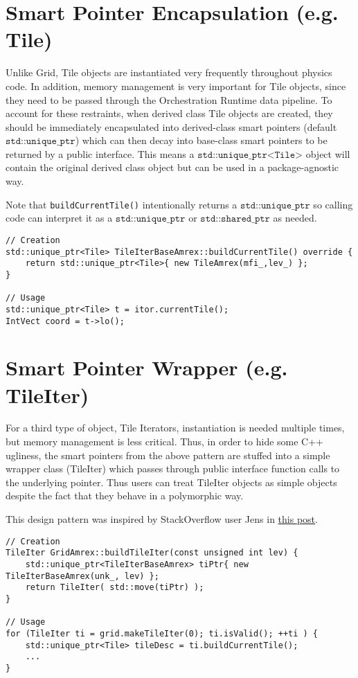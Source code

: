 \documentclass[letterpaper,12pt]{article}
\begin{document}
\section{Smart Pointer Encapsulation (e.g. Tile)}

Unlike Grid, Tile objects are instantiated very frequently throughout physics code. In addition, memory management is very important for Tile objects, since they need to be passed through the Orchestration Runtime data pipeline. To account for these restraints, when derived class Tile objects are created, they should be immediately encapsulated into derived-class smart pointers (default $\texttt{std::unique\_ptr}$) which can then decay into base-class smart pointers to be returned by a public interface. This means a $\texttt{std::unique\_ptr<Tile>}$ object will contain the original derived class object but can be used in a package-agnostic way.

Note that \texttt{buildCurrentTile()}  intentionally returns a $\texttt{std::unique\_ptr}$ so calling code can interpret it as a $\texttt{std::unique\_ptr}$ or $\texttt{std::shared\_ptr}$ as needed.

\begin{verbatim}
// Creation
std::unique_ptr<Tile> TileIterBaseAmrex::buildCurrentTile() override {
    return std::unique_ptr<Tile>{ new TileAmrex(mfi_,lev_) };
}

// Usage
std::unique_ptr<Tile> t = itor.currentTile();
IntVect coord = t->lo();
\end{verbatim}

\section{Smart Pointer Wrapper (e.g. TileIter) }

For a third type of object, Tile Iterators,  instantiation is needed multiple times, but memory management is less critical. Thus, in order to hide some C++ ugliness, the smart pointers from the above pattern are stuffed into a simple wrapper class (TileIter) which passes through public interface function calls to the underlying pointer. Thus users can treat TileIter objects as simple objects despite the fact that they behave in a polymorphic way.

This design pattern was inspired by StackOverflow user Jens in \href{https://stackoverflow.com/a/38011637}{this post}.

\begin{verbatim}
// Creation
TileIter GridAmrex::buildTileIter(const unsigned int lev) {
    std::unique_ptr<TileIterBaseAmrex> tiPtr{ new TileIterBaseAmrex(unk_, lev) };
    return TileIter( std::move(tiPtr) );
}

// Usage
for (TileIter ti = grid.makeTileIter(0); ti.isValid(); ++ti ) {
    std::unique_ptr<Tile> tileDesc = ti.buildCurrentTile();
    ...
}


\end{verbatim}
\end{document}
